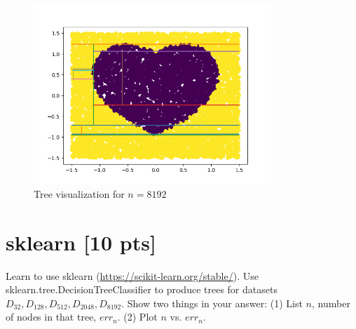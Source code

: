 \documentclass[a4paper]{article}
\theoremstyle{definition}
\newenvironment{soln}{
    \leavevmode\color{blue}\ignorespaces
}{}
\begin{document}
\begin{soln}
    \begin{figure}[H]
      \centering
      \includegraphics[width=0.8\textwidth]{../plots/dbig_8192.png}
      \caption{Tree visualization for $n = 8192$}
      \label{fig:dbig_8192}
    \end{figure}
  \end{soln} 

\section{sklearn [10 pts]}
Learn to use sklearn (\url{https://scikit-learn.org/stable/}).
Use sklearn.tree.DecisionTreeClassifier to produce trees for datasets $D_{32}, D_{128}, D_{512}, D_{2048}, D_{8192}$.  Show two things in your answer: (1) List $n$, number of nodes in that tree, $err_n$. (2) Plot $n$ vs. $err_n$.
\end{document}
